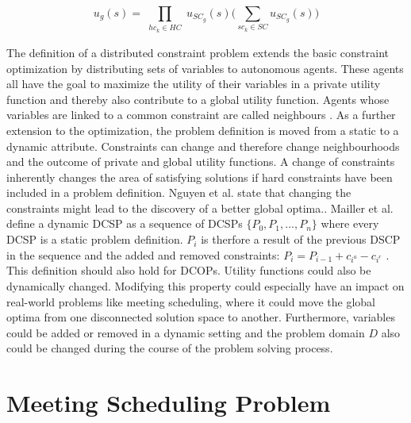 \[ u_{g}(s) = \prod_{\substack{hc_{k} \in HC}} u_{SC_{g}}(s) \bigg( \sum_{sc_{k} \in SC} u_{SC_{g}}(s) \bigg)\]  %


The definition of a distributed constraint problem extends the basic constraint optimization by distributing sets of variables to autonomous agents. These agents all have the goal to maximize the utility of their variables in a private utility function and thereby also contribute to a global utility function. Agents whose variables are linked to a common constraint are called neighbours \cite{Chapman2011, Farinelli, Petcu2003}.
\newline\newline 
As a further extension to the optimization, the problem definition is moved from a static to a dynamic attribute. Constraints can change and  therefore change neighbourhoods and the outcome of private and global utility functions. A change of constraints inherently changes the area of satisfying solutions if hard constraints have been included in a problem definition. Nguyen et al. state that changing the constraints might lead to the discovery of a better global optima.\cite{Nguyen2012}. Mailler et al. define a dynamic DCSP as a sequence of DCSPs \(\{P_{0}, P_{1}, ..., P_{n}\}\) where every DCSP is a static problem definition. \(P_{i}\) is therfore a result of the previous DSCP in the sequence and the added and removed constraints: \(P_{i} = P_{i-1} + c_{i^{a}} - c_{i^{r}}\) \cite{Maillera}. This definition should also hold for DCOPs. Utility functions could also be dynamically changed. Modifying this property could especially have an impact on real-world problems like meeting scheduling, where it could move the global optima from one disconnected solution space to another\cite{Nguyen2012}. Furthermore, variables could be added or removed in a dynamic setting and the problem domain \(D\) also could be changed during the course of the problem solving process.

\section{Meeting Scheduling Problem}  

